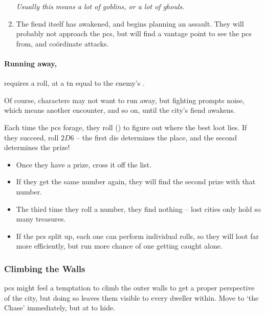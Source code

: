 \begin{multicols}{2}
\begin{enumerate}
  \textit{Usually this means a lot of goblins, or a lot of ghouls.}
  \item
  The fiend itself has awakened, and begins planning an assault.
  They will probably not approach the \glspl{pc}, but will find a vantage point to see the \glspl{pc} from, and co\"ordinate attacks.
\end{enumerate}

\paragraph{Running away,}
requires a  roll, at a \gls{tn} equal to the enemy's .

Of course, characters may not want to run away, but fighting prompts noise, which means another encounter, and so on, until the city's fiend awakens.

\label{lostForaging}

Each time the \glspl{pc} forage, they roll  (\tn[12]) to figure out where the best loot lies.
If they succeed, roll $2D6$ -- the first die determines the place, and the second determines the prize!

\begin{itemize}
  \item
  Once they have a prize, cross it off the list.
  \item
  If they get the same number again, they will find the second prize with that number.
  \item
  The third time they roll a number, they find nothing -- lost cities only hold so many treasures.
  \item
  If the \glspl{pc} split up, each one can perform individual rolls, so they will loot far more efficiently, but run more chance of one getting caught alone.

\end{itemize}

\subsubsection{Climbing the Walls}

\Glspl{pc} might feel a temptation to climb the outer walls to get a proper perspective of the city, but doing so leaves them visible to every dweller within.
Move to `the Chase' immediately, but at \tn[12] to hide.

\end{multicols}

